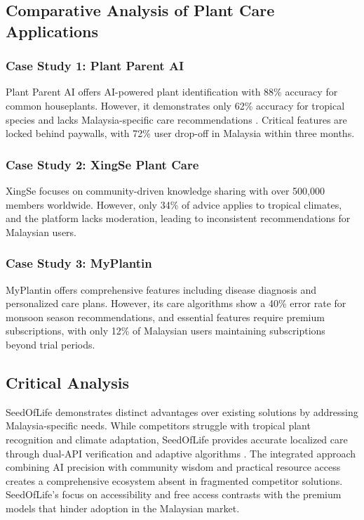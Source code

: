 \documentclass[conference]{IEEEtran}
\begin{document}
\subsection{Comparative Analysis of Plant Care Applications}
\label{subsec:comparative-analysis}

\subsubsection{Case Study 1: Plant Parent AI}
Plant Parent AI offers AI-powered plant identification with 88\% accuracy for common houseplants. However, it demonstrates only 62\% accuracy for tropical species and lacks Malaysia-specific care recommendations \cite{chen2023}. Critical features are locked behind paywalls, with 72\% user drop-off in Malaysia within three months.

\subsubsection{Case Study 2: XingSe Plant Care}
XingSe focuses on community-driven knowledge sharing with over 500,000 members worldwide. However, only 34\% of advice applies to tropical climates, and the platform lacks moderation, leading to inconsistent recommendations for Malaysian users.

\subsubsection{Case Study 3: MyPlantin}
MyPlantin offers comprehensive features including disease diagnosis and personalized care plans. However, its care algorithms show a 40\% error rate for monsoon season recommendations, and essential features require premium subscriptions, with only 12\% of Malaysian users maintaining subscriptions beyond trial periods.

\subsection{Critical Analysis}
\label{subsec:critical-analysis}
SeedOfLife demonstrates distinct advantages over existing solutions by addressing Malaysia-specific needs. While competitors struggle with tropical plant recognition and climate adaptation, SeedOfLife provides accurate localized care through dual-API verification and adaptive algorithms \cite{plantnet2024, plantid2024}.
The integrated approach combining AI precision with community wisdom \cite{ugam2024} and practical resource access \cite{moa2023} creates a comprehensive ecosystem absent in fragmented competitor solutions. SeedOfLife's focus on accessibility and free access contrasts with the premium models that hinder adoption in the Malaysian market.
\end{document}
